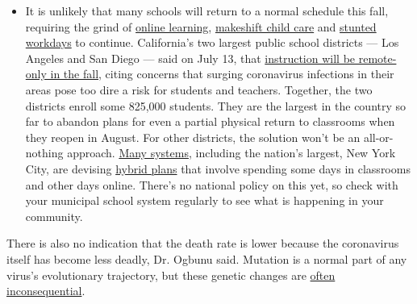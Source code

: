 \begin{itemize}
  \begin{itemize}
  \tightlist
  \item
    It is unlikely that many schools will return to a normal schedule
    this fall, requiring the grind of
    \href{https://www.nytimes3xbfgragh.onion/2020/06/05/us/coronavirus-education-lost-learning.html?action=click\&pgtype=Article\&state=default\&region=MAIN_CONTENT_3\&context=storylines_faq}{online
    learning},
    \href{https://www.nytimes3xbfgragh.onion/2020/05/29/us/coronavirus-child-care-centers.html?action=click\&pgtype=Article\&state=default\&region=MAIN_CONTENT_3\&context=storylines_faq}{makeshift
    child care} and
    \href{https://www.nytimes3xbfgragh.onion/2020/06/03/business/economy/coronavirus-working-women.html?action=click\&pgtype=Article\&state=default\&region=MAIN_CONTENT_3\&context=storylines_faq}{stunted
    workdays} to continue. California's two largest public school
    districts --- Los Angeles and San Diego --- said on July 13, that
    \href{https://www.nytimes3xbfgragh.onion/2020/07/13/us/lausd-san-diego-school-reopening.html?action=click\&pgtype=Article\&state=default\&region=MAIN_CONTENT_3\&context=storylines_faq}{instruction
    will be remote-only in the fall}, citing concerns that surging
    coronavirus infections in their areas pose too dire a risk for
    students and teachers. Together, the two districts enroll some
    825,000 students. They are the largest in the country so far to
    abandon plans for even a partial physical return to classrooms when
    they reopen in August. For other districts, the solution won't be an
    all-or-nothing approach.
    \href{https://bioethics.jhu.edu/research-and-outreach/projects/eschool-initiative/school-policy-tracker/}{Many
    systems}, including the nation's largest, New York City, are
    devising
    \href{https://www.nytimes3xbfgragh.onion/2020/06/26/us/coronavirus-schools-reopen-fall.html?action=click\&pgtype=Article\&state=default\&region=MAIN_CONTENT_3\&context=storylines_faq}{hybrid
    plans} that involve spending some days in classrooms and other days
    online. There's no national policy on this yet, so check with your
    municipal school system regularly to see what is happening in your
    community.
  \end{itemize}
\end{itemize}

There is also no indication that the death rate is lower because the
coronavirus itself has become less deadly, Dr. Ogbunu said. Mutation is
a normal part of any virus's evolutionary trajectory, but these genetic
changes are
\href{https://undark.org/2020/05/14/covid-19-evolution-mutation/}{often
inconsequential}.

